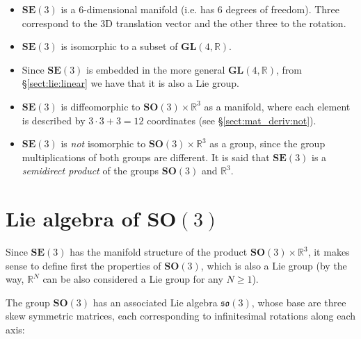\documentclass[a4paper,11pt]{report}
\begin{document}
\begin{itemize}
 \item $\mathbf{SE}(3)$ is a 6-dimensional manifold (i.e. has 6 degrees of freedom). Three correspond to the 3D translation vector and the other three to the rotation.
 \item  $\mathbf{SE}(3)$ is isomorphic to a subset of $\mathbf{GL}(4,\mathbb{R})$.
 \item Since $\mathbf{SE}(3)$ is embedded in the more general $\mathbf{GL}(4,\mathbb{R})$, 
         from \S\ref{sect:lie:linear} we have that it is also a Lie group.
 \item  $\mathbf{SE}(3)$ is diffeomorphic to $\mathbf{SO}(3) \times \mathbb{R}^3$ as a manifold,
  where each element is described by $3\cdot 3+3=12$ coordinates (see \S\ref{sect:mat_deriv:not}).
 \item  $\mathbf{SE}(3)$ is \emph{not} isomorphic to $\mathbf{SO}(3) \times \mathbb{R}^3$ as a group, 
since the group multiplications of both groups are different. 
It is said that $\mathbf{SE}(3)$ is a \emph{semidirect product} of 
the groups $\mathbf{SO}(3)$ and $\mathbb{R}^3$.
\end{itemize}



\section{Lie algebra of $\mathbf{SO}(3)$}

Since $\mathbf{SE}(3)$ has the manifold structure of the product 
$\mathbf{SO}(3) \times \mathbb{R}^3$, it makes sense to define first 
the properties of $\mathbf{SO}(3)$, which is also a Lie group 
(by the way, $\mathbb{R}^N$ can be also considered a Lie group for any $N \geq 1$).


The group $\mathbf{SO}(3)$ has an associated Lie algebra $\mathfrak{so}(3)$, 
whose base are three skew symmetric matrices, each corresponding to 
infinitesimal rotations along each axis:
\end{document}
